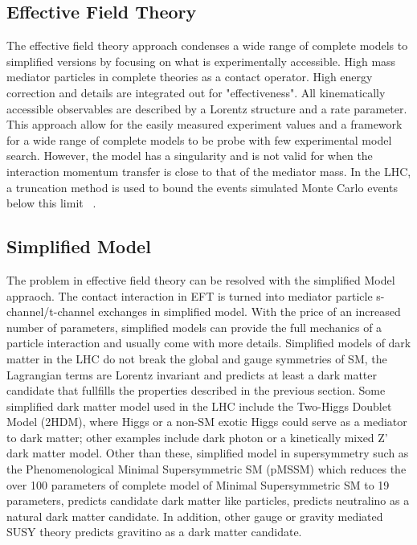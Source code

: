 \subsection{Effective Field Theory}
The effective field theory approach condenses a wide range of complete models to simplified versions by focusing on what is experimentally accessible. High mass mediator particles in complete theories as a contact operator. High energy correction and details are integrated out for "effectiveness". All kinematically accessible observables are described by a Lorentz structure and a rate parameter. 
This approach allow for the easily measured experiment values and a framework for a wide range of complete models to be probe with few experimental model search. However, the model has a singularity and is not valid for when the interaction momentum transfer is close to that of the mediator mass. In the LHC, a truncation method is used to bound the events simulated Monte Carlo events below this limit ~\cite{Busoni_2014}.

\subsection{Simplified Model}
The problem in effective field theory can be resolved with the simplified Model appraoch. The contact interaction in EFT is turned into mediator particle s-channel/t-channel exchanges in simplified model. With the price of an increased number of parameters, simplified models can provide the full mechanics of a particle interaction and usually come with more details. 
Simplified models of dark matter in the LHC do not break the global and gauge symmetries of SM, the Lagrangian terms are Lorentz invariant and predicts at least a dark matter candidate that fullfills the properties described in the previous section. 
Some simplified dark matter model used in the LHC include the Two-Higgs Doublet Model (2HDM), where Higgs or a non-SM exotic Higgs could serve as a mediator to dark matter; other examples include dark photon or a kinetically mixed Z' dark matter model. 
Other than these, simplified model in supersymmetry such as the Phenomenological Minimal Supersymmetric SM (pMSSM) which reduces the over 100 parameters of complete model of Minimal Supersymmetric SM to 19 parameters, predicts candidate dark matter like particles, predicts neutralino as a natural dark matter candidate. 
In addition, other gauge or gravity mediated SUSY theory predicts gravitino as a dark matter candidate. 

